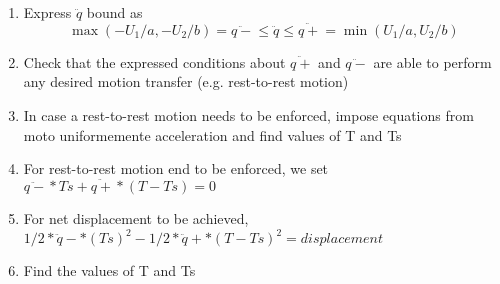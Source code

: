 \documentclass[a4paper,12pt]{article}
\begin{document}
\begin{enumerate}
\begin{enumerate}
 \item Express $\ddot{q}$ bound as 
 \begin{equation}
    \max(-U_1/a, -U_2/b) = \ddot{q-} \leq \ddot{q} \leq \ddot{q+} = \min(U_1/a, U_2/b)
 \end{equation}
 \item Check that the expressed conditions about $\ddot{q+}$ and $\ddot{q-}$
  are able to perform any desired motion transfer (e.g. rest-to-rest motion)
 \item In case a rest-to-rest motion needs to be
  enforced, impose equations from moto uniformemente 
  acceleration and find values of T and Ts
 \item For rest-to-rest motion end to be enforced, 
 we set $\ddot{q-}*Ts + \ddot{q+} *(T-Ts) = 0$
 \item For net displacement to be 
 achieved, $1/2*\ddot{q}-*(Ts)^2 - 1/2*\ddot{q}+*(T-Ts)^2 = displacement$
 \item Find the values of T and Ts
\end{enumerate}

\end{enumerate}
\end{document}
